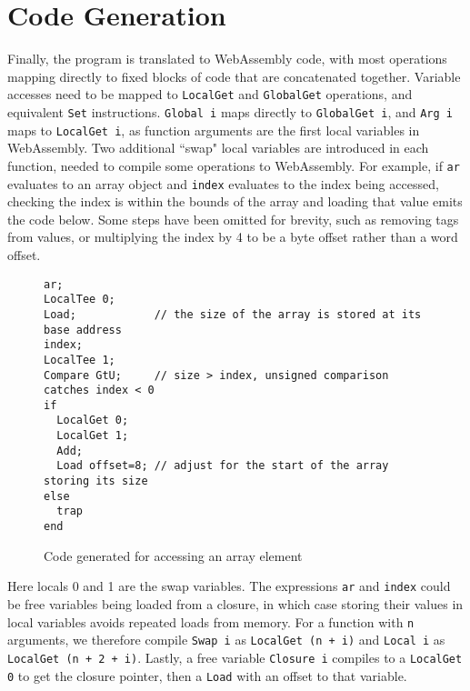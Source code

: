 \section{Code Generation}

Finally, the program is translated to WebAssembly code, with most operations mapping directly to fixed blocks of code that are concatenated together. Variable accesses need to be mapped to \verb|LocalGet| and \verb|GlobalGet| operations, and equivalent \verb|Set| instructions. \verb|Global i| maps directly to \verb|GlobalGet i|, and \verb|Arg i| maps to \verb|LocalGet i|, as function arguments are the first local variables in WebAssembly. Two additional ``swap" local variables are introduced in each function, needed to compile some operations to WebAssembly. 
For example, if \verb|ar| evaluates to an array object and \verb|index| evaluates to the index being accessed, checking the index is within the bounds of the array and loading that value emits the code below. Some steps have been omitted for brevity, such as removing tags from values, or multiplying the index by 4 to be a byte offset rather than a word offset.

\begin{figure}[H]
\begin{verbatim}
ar; 
LocalTee 0;
Load;            // the size of the array is stored at its base address
index; 
LocalTee 1; 
Compare GtU;     // size > index, unsigned comparison catches index < 0
if
  LocalGet 0;
  LocalGet 1;
  Add;
  Load offset=8; // adjust for the start of the array storing its size
else
  trap 
end
\end{verbatim}
\caption{Code generated for accessing an array element}
\end{figure}

Here locals 0 and 1 are the swap variables. The expressions \verb|ar| and \verb|index| could be free variables being loaded from a closure, in which case storing their values in local variables avoids repeated loads from memory. 
 For a function with \verb|n| arguments, we therefore compile \verb|Swap i| as \verb|LocalGet (n + i)| and \verb|Local i| as \verb|LocalGet (n + 2 + i)|. Lastly,  a free variable \verb|Closure i| compiles to a \verb|LocalGet 0| to get the closure pointer, then a \verb|Load| with an offset to that variable.




